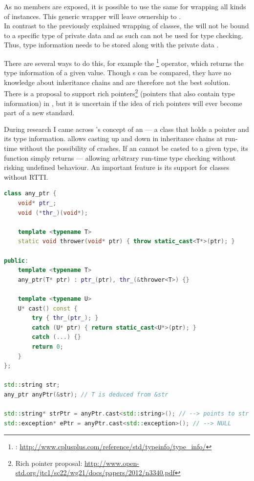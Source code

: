 As no members are exposed, it is possible to use the same  for wrapping all kinds of  instances. This generic wrapper will leave ownership to .\\
In contrast to the previously explained wrapping of classes, the   will not be bound to a specific type of private data and as such can not be used for type checking. Thus, type information needs to be stored along with the private data .

There are several ways to do this, for example the  \footnote{: \url{http://www.cplusplus.com/reference/std/typeinfo/type_info/}} operator, which returns the type information of a given value. Though s can be compared, they have no knowledge about inheritance chains and are therefore not the best solution.\\
There is a proposal to support rich pointers\footnote{Rich pointer proposal: \url{http://www.open-std.org/jtc1/sc22/wg21/docs/papers/2012/n3340.pdf}} (pointers that also contain type information) in , but it is uncertain if the idea of rich pointers will ever become part of a new  standard.

During research I came across 's concept of an  --- a class that holds a pointer and its type information.  allows casting up and down in inheritance chains at run-time without the possibility of crashes. If an  cannot be casted to a given type, its  function simply returns  --- allowing arbitrary run-time type checking without risking undefined behaviour. An important feature is its support for classes without RTTI.

\begin{lstlisting}[language=C++, caption=Implementation of \mySCName{any\_ptr}]
class any_ptr {
    void* ptr_;
    void (*thr_)(void*);
 
    template <typename T>
    static void thrower(void* ptr) { throw static_cast<T*>(ptr); }
 
public:
    template <typename T>
    any_ptr(T* ptr) : ptr_(ptr), thr_(&thrower<T>) {}
 
    template <typename U>
    U* cast() const {
        try { thr_(ptr_); }
        catch (U* ptr) { return static_cast<U*>(ptr); }
        catch (...) {}
        return 0;
    }
};

std::string str;
any_ptr anyPtr(&str); // T is deduced from &str

std::string* strPtr = anyPtr.cast<std::string>(); // --> points to str
std::exception* ePtr = anyPtr.cast<std::exception>(); // --> NULL
\end{lstlisting}
\OnehalfSpacing

